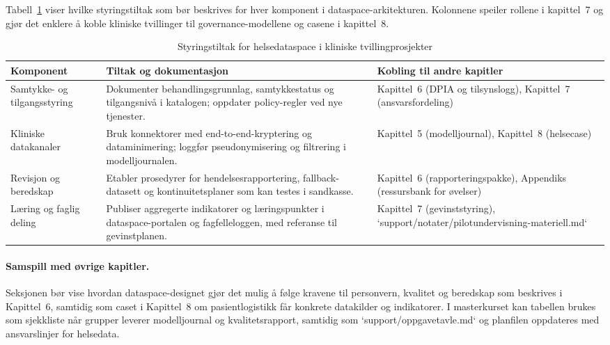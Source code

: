 Tabell~\ref{tab:kap03-helsedataspace} viser hvilke styringstiltak som bør beskrives for hver komponent i dataspace-arkitekturen.
Kolonnene speiler rollene i kapittel~7 og gjør det enklere å koble kliniske tvillinger til governance-modellene og casene i
kapittel~8.

\begin{table}[htbp]
    \centering
    \caption{Styringstiltak for helsedataspace i kliniske tvillingprosjekter}
    \label{tab:kap03-helsedataspace}
    \begin{tabular}{p{3.6cm}p{5.0cm}p{4.4cm}}
        \toprule
        \textbf{Komponent} & \textbf{Tiltak og dokumentasjon} & \textbf{Kobling til andre kapitler} \\
        \midrule
        Samtykke- og tilgangsstyring & Dokumenter behandlingsgrunnlag, samtykkestatus og tilgangsnivå i katalogen; oppdater policy-regler ved nye tjenester. & Kapittel~6 (DPIA og tilsynslogg), Kapittel~7 (ansvarsfordeling) \\
        Kliniske datakanaler & Bruk konnektorer med end-to-end-kryptering og dataminimering; loggfør pseudonymisering og filtrering i modelljournalen. & Kapittel~5 (modelljournal), Kapittel~8 (helsecase) \\
        Revisjon og beredskap & Etabler prosedyrer for hendelsesrapportering, fallback-datasett og kontinuitetsplaner som kan testes i sandkasse. & Kapittel~6 (rapporteringspakke), Appendiks (ressursbank for øvelser) \\
        Læring og faglig deling & Publiser aggregerte indikatorer og læringspunkter i dataspace-portalen og fagfelleloggen, med referanse til gevinstplanen. & Kapittel~7 (gevinststyring), `support/notater/pilotundervisning-materiell.md` \\
        \bottomrule
    \end{tabular}
\end{table}

\paragraph{Samspill med øvrige kapitler.} Seksjonen bør vise hvordan dataspace-designet gjør det mulig å følge kravene til
personvern, kvalitet og beredskap som beskrives i Kapittel~6, samtidig som caset i Kapittel~8 om pasientlogistikk får konkrete
datakilder og indikatorer. I masterkurset kan tabellen brukes som sjekkliste når grupper leverer modelljournal og kvalitetsrapport,
samtidig som `support/oppgavetavle.md` og planfilen oppdateres med ansvarslinjer for helsedata.

